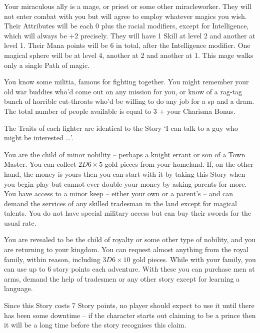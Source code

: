 \begin{multicols}{2}
Your miraculous ally is a mage, or priest or some other \gls{miracleworker}. They will not enter combat with you but will agree to employ whatever magics you wish. Their Attributes will be each 0 plus the racial modifiers, except for Intelligence, which will always be +2 precisely. They will have 1 Skill at level 2 and another at level 1. Their Mana points will be 6 in total, after the Intelligence modifier. One magical sphere will be at level 4, another at 2 and another at 1. This mage walks only a single Path of magic.

You know some militia, famous for fighting together. You might remember your old war buddies who'd come out on any mission for you, or know of a rag-tag bunch of horrible cut-throats who'd be willing to do any job for a \gls{sp} and a dram. The total number of people available is equal to 3 + your Charisma Bonus.

The Traits of each fighter are identical to the Story `I can talk to a guy who might be interested {\dots}'.

You are the child of minor nobility -- perhaps a knight errant or son of a Town Master.
You can collect $2D6 \times 5$ gold pieces from your homeland.
If, on the other hand, the money is yours then you can start with it by taking this Story when you begin play but cannot ever double your money by asking parents for more.
You have access to a minor keep -- either your own or a parent's -- and can demand the services of any skilled tradesman in the land except for magical talents.
You do not have special military access but can buy their swords for the usual rate.

You are revealed to be the child of royalty or some other type of nobility, and you are returning to your kingdom.
You can request almost anything from the royal family, within reason, including $3D6 \times 10$ gold pieces.
While with your family, you can use up to 6 story points each adventure. With these you can purchase men at arms, demand the help of tradesmen or any other story except for learning a language.

Since this Story costs 7 Story points, no player should expect to use it until there has been some downtime -- if the character starts out claiming to be a prince then it will be a long time before the story recognises this claim.

\end{multicols}

